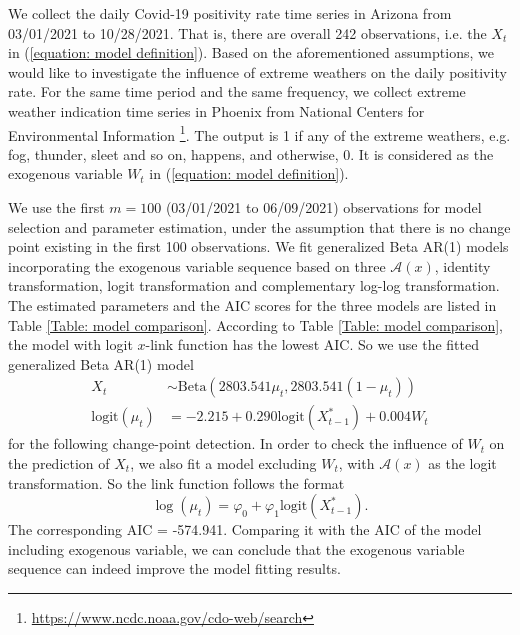 \documentclass{article}
\theoremstyle{definition}
\begin{document}
We collect the daily Covid-19 positivity rate time series in Arizona from 03/01/2021 to 10/28/2021. That is, there are overall 242 observations, i.e. the $X_t$ in (\ref{equation: model definition}). Based on the aforementioned assumptions, we would like to investigate the influence of extreme weathers on the daily positivity rate. For the same time period and the same frequency, we collect extreme weather indication time series in Phoenix from National Centers for Environmental Information \footnote{\url{https://www.ncdc.noaa.gov/cdo-web/search}}. The output is 1 if any of the extreme weathers, e.g. fog, thunder, sleet and so on, happens, and otherwise, 0. It is considered as the exogenous variable $W_t$ in (\ref{equation: model definition}).

We use the first $m=100$ (03/01/2021 to 06/09/2021) observations for model selection and parameter estimation, under the assumption that there is no change point existing in the first 100 observations. We fit generalized Beta AR(1) models incorporating the exogenous variable sequence based on three $\mathcal{A}(x)$, identity transformation, logit transformation and complementary log-log transformation. The estimated parameters and the AIC scores for the three models are listed in Table \ref{Table: model comparison}. According to Table \ref{Table: model comparison}, the model with logit $x$-link function has the lowest AIC. So we use the fitted generalized Beta AR(1) model 
\begin{equation}
\begin{aligned}
    X_t &\sim \text{Beta} (2803.541 \mu_t, 2803.541 (1-\mu_t)) \\
\text{logit}(\mu_t) &= -2.215+0.290 \text{logit}(X_{t-1}^*)+0.004W_t
\end{aligned}
\end{equation}
for the following change-point detection. In order to check the influence of $W_t$ on the prediction of $X_t$, we also fit a model excluding $W_t$, with $\mathcal{A}(x)$ as the logit transformation. So the link function follows the format
\begin{equation*}
    \log(\mu_t) = \varphi_0+\varphi_1 \text{logit}(X_{t-1}^*).
\end{equation*}
The corresponding AIC = -574.941. Comparing it with the AIC of the model including exogenous variable, we can conclude that the exogenous variable sequence can indeed improve the model fitting results. 
\end{document}
